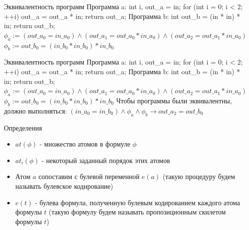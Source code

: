 \documentclass{beamer}
\begin{document}
\begin{frame}{Эквивалентность программ}
Программа a:\newline
int i, out\_a = in;\newline
for (int i = 0; i < 2; ++i) out\_a = out\_a * in;\newline
return out\_a;\newline
Программа b:\newline
int out\_b = (in * in) * in;\newline
return out\_b;\newline
$\phi_a := (out\_a_0 = in\_a_0) \wedge (out\_a_1 = out\_a_0 * in\_a_0) \wedge (out\_a_2 = out\_a_1 * in\_a_0)$\newline
$\phi_b := out\_b_0 = (in\_b_0 * in\_b_0) * in\_b_0$\newline
\end{frame}

\begin{frame}{Эквивалентность программ}
Программа a:\newline
int i, out\_a = in;\newline
for (int i = 0; i < 2; ++i) out\_a = out\_a * in;\newline
return out\_a;\newline
Программа b:\newline
int out\_b = (in * in) * in;\newline
return out\_b;\newline
$\phi_a := (out\_a_0 = in\_a_0) \wedge (out\_a_1 = out\_a_0 * in\_a_0) \wedge (out\_a_2 = out\_a_1 * in\_a_0)$\newline
$\phi_b := out\_b_0 = (in\_b_0 * in\_b_0) * in\_b_0$\newline
Чтобы программы были эквивалентны, должно выполняться:\newline
$(in\_a_0 = in\_b_0) \wedge \phi_a \wedge \phi_b \rightarrow out\_a_2 = out\_b_0$
\end{frame}

\begin{frame}{Определения}
\begin{itemize}
\item $at(\phi)$ - множество атомов в формуле $\phi$
\item $at_i(\phi)$ - некоторый заданный порядок этих атомов
\item Атом $a$ сопоставим с булевой переменной $e(a)$ (такую процедуру будем называть булевское кодирование)
\item $e(t)$ - булева формула, полученную булевым кодированием каждого атома формулы $t$ (такую формулу будем называть
пропозиционным скилетом формулы $t$)
\end{itemize}
\end{frame}
\end{document}
